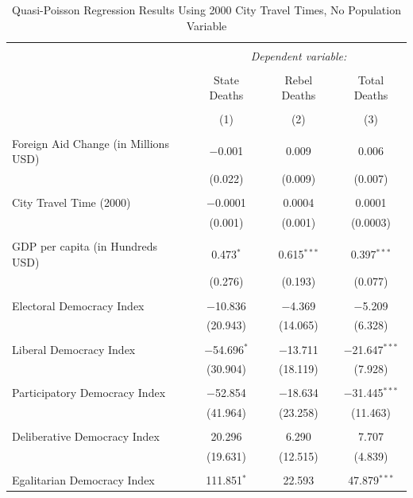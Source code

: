 \documentclass[12pt, letterpaper]{article}
\begin{document}
\begin{table}[!htbp] \centering 
	  \caption{Quasi-Poisson Regression Results Using 2000 City Travel Times, No Population Variable} 
	\begin{tabular}{@{\extracolsep{5pt}}lccc} 
		\\[-1.8ex]\hline 
		\hline \\[-1.8ex] 
		& \multicolumn{3}{c}{\textit{Dependent variable:}} \\ 
		\cline{2-4} 
		\\[-1.8ex] & State Deaths & Rebel Deaths & Total Deaths \\ 
		\\[-1.8ex] & (1) & (2) & (3)\\ 
		\hline \\[-1.8ex] 
		Foreign Aid Change (in Millions USD) & $-$0.001 & 0.009 & 0.006 \\ 
		& (0.022) & (0.009) & (0.007) \\ 
		& & & \\ 
		City Travel Time (2000) & $-$0.0001 & 0.0004 & 0.0001 \\ 
		& (0.001) & (0.001) & (0.0003) \\ 
		& & & \\ 
		GDP per capita (in Hundreds USD) & 0.473$^{*}$ & 0.615$^{***}$ & 0.397$^{***}$ \\ 
		& (0.276) & (0.193) & (0.077) \\ 
		& & & \\ 
		Electoral Democracy Index & $-$10.836 & $-$4.369 & $-$5.209 \\ 
		& (20.943) & (14.065) & (6.328) \\ 
		& & & \\ 
		Liberal Democracy Index & $-$54.696$^{*}$ & $-$13.711 & $-$21.647$^{***}$ \\ 
		& (30.904) & (18.119) & (7.928) \\ 
		& & & \\ 
		Participatory Democracy Index & $-$52.854 & $-$18.634 & $-$31.445$^{***}$ \\ 
		& (41.964) & (23.258) & (11.463) \\ 
		& & & \\ 
		Deliberative Democracy Index & 20.296 & 6.290 & 7.707 \\ 
		& (19.631) & (12.515) & (4.839) \\ 
		& & & \\ 
		Egalitarian Democracy Index & 111.851$^{*}$ & 22.593 & 47.879$^{***}$ \\ 

\end{tabular}
\end{table}
\end{document}
